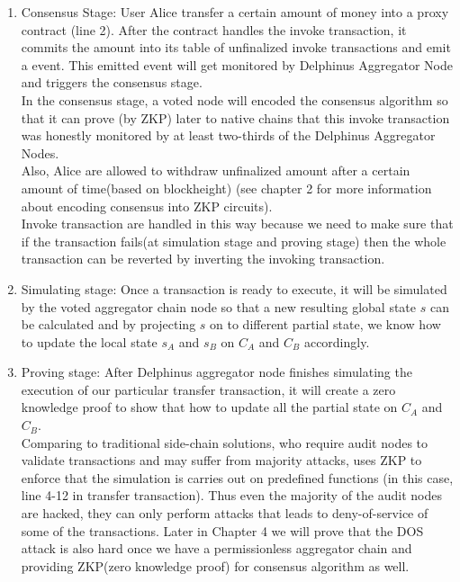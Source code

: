 \documentclass[acmtog, natbib=false]{acmart}
\begin{document}
\begin{enumerate}[leftmargin=*]
\item Consensus Stage:
User Alice transfer a certain amount of money into a proxy contract (line 2). After the contract handles the invoke transaction, it commits the amount into its table of unfinalized invoke transactions and emit a event. This emitted event will get monitored by Delphinus Aggregator Node and triggers the consensus stage.\\
\newline
In the consensus stage, a voted node will encoded the consensus algorithm so that it can prove (by ZKP) later to native chains that this invoke transaction was honestly monitored by at least two-thirds of the Delphinus Aggregator Nodes. \\
\newline
Also, Alice are allowed to withdraw unfinalized amount after a certain amount of time(based on blockheight) (see chapter 2 for more information about encoding consensus into ZKP circuits).\\
\newline
Invoke transaction are handled in this way because we need to make sure that if the transaction fails(at simulation stage and proving stage) then the whole transaction can be reverted by inverting the invoking transaction.\\
\item Simulating stage:
Once a transaction is ready to execute, it will be simulated by the voted aggregator chain node so that a new resulting global state $s$ can be calculated and by projecting $s$ on to different partial state, we know how to update the local state $s_A$ and $s_B$ on $C_A$ and $C_B$ accordingly.\\
\item Proving stage:
After Delphinus aggregator node finishes simulating the execution of our particular transfer transaction, it will create a zero knowledge proof to show that how to update all the partial state on $C_A$  and $C_B$.\\
\newline
Comparing to traditional side-chain solutions, who require audit nodes to validate transactions and may suffer from majority attacks, \dprotocol uses ZKP to enforce that the simulation is carries out on predefined functions (in this case, line 4-12 in transfer transaction). Thus even the majority of the audit nodes are hacked, they can only perform attacks that leads to deny-of-service of some of the transactions. Later in Chapter 4 we will prove that the DOS attack is also hard once we have a permissionless aggregator chain and providing ZKP(zero knowledge proof) for consensus algorithm as well.\\ 

\end{enumerate}
\end{document}
